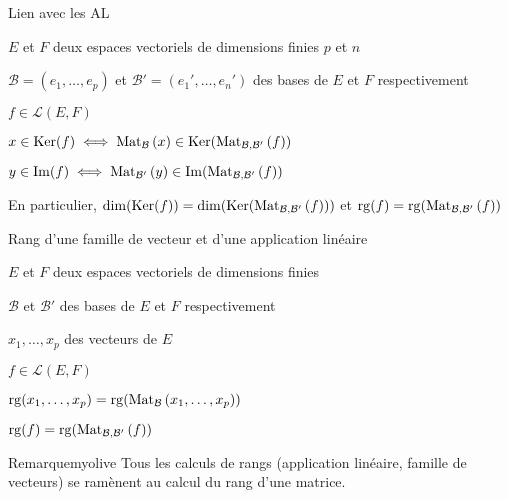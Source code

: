     \begin{prop}{Lien avec les AL}{}
        \begin{soient}
            \item $E$ et $F$ deux espaces vectoriels de dimensions finies $p$ et $n$
            \item $\mathcal{B} = (e_1, \ldots, e_p)$ et $\mathcal{B}' = (e_1', \ldots, e_n')$ des bases de $E$ et $F$ respectivement
            \item $f \in \mathcal{L}(E,F)$
        \end{soient}
        \begin{alors}
            \item $x \in \operatorname{Ker}(f) \iff \text{Mat}_{\mathcal{B}}\left(x\right) \in \operatorname{Ker}(\text{Mat}_{\mathcal{B},\mathcal{B}'}\left(f\right))$
            \item $y \in \operatorname{Im}(f) \iff \text{Mat}_{\mathcal{B}'}\left(y\right) \in \operatorname{Im}(\text{Mat}_{\mathcal{B},\mathcal{B}'}\left(f\right))$
        \end{alors}
        En particulier, $\dim(\operatorname{Ker}(f)) = \dim(\operatorname{Ker}(\text{Mat}_{\mathcal{B},\mathcal{B}'}\left(f\right)))$ et $\operatorname{rg}(f) = \operatorname{rg}(\text{Mat}_{\mathcal{B},\mathcal{B}'}\left(f\right))$
    \end{prop}

    \begin{prop}{Rang d’une famille de vecteur et d’une application linéaire}{}
        \begin{soit}
            \item $E$ et $F$ deux espaces vectoriels de dimensions finies
            \item $\mathcal{B}$ et $\mathcal{B}'$ des bases de $E$ et $F$ respectivement
            \item $x_1,\ldots,x_p$ des vecteurs de $E$
            \item $f \in \mathcal{L}(E,F)$
        \end{soit}
        \begin{alors}
            \item $\operatorname{rg}(x_1,\ldots,x_p) = \operatorname{rg}(\text{Mat}_{\mathcal{B}}\left(x_1,\ldots,x_p\right))$
            \item $\operatorname{rg}(f) = \operatorname{rg}(\text{Mat}_{\mathcal{B},\mathcal{B}'}\left(f\right))$
        \end{alors}
    \end{prop}

    \begin{omed}{Remarque}{myolive}
        Tous les calculs de rangs (application linéaire, famille de vecteurs) se ramènent au calcul du rang d’une matrice.
    \end{omed}

